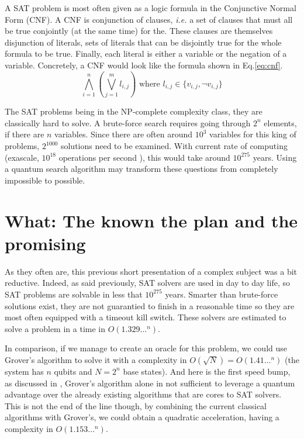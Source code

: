 \documentclass{article}
\begin{document}
A SAT problem is most often given as a logic formula in the Conjunctive Normal
Form (CNF). A CNF is conjunction of clauses, \emph{i.e.} a set of clauses that
must all be true conjointly (at the same time) for the. These clauses are
themselves disjunction of literals, sets of literals that can be disjointly true
for the whole formula to be true. Finally, each literal is either a variable or
the negation of a variable. Concretely, a CNF would look like the formula shown
in Eq.\ref{eq:cnf}.
\begin{equation}
\label{eq:cnf}
\bigwedge_{i=1}^n \left(\bigvee_{j=1}^m l_{i,j}\right) \text{ where } l_{i,j} \in
\{v_{i,j},\neg v_{i,j}\}
\end{equation}

The SAT problems being in the NP-complete complexity class, they are classically
hard to solve. A brute-force search requires going through $2^n$ elements, if
there are $n$ variables. Since there are often around $10^3$ variables for this
king of problems, $2^{1000}$ solutions need to be examined. With current rate of
computing (exascale, $10^{18}$ operations per second \cite{Hin18}), this would
take around $10^{275}$ years. Using a quantum search algorithm may transform
these questions from completely impossible to possible.

\section{What: The known the plan and the promising}
\label{sec:the_known_the_plan_and_the_promising}

As they often are, this previous short presentation of a complex subject was a
bit reductive. Indeed, as said previously, SAT solvers are used in day to day
life, so SAT problems are solvable in less that $10^{275}$ years. Smarter than
brute-force solutions exist, they are not guarantied to finish in a reasonable
time so they are most often equipped with a timeout kill switch. These solvers
are estimated to solve a problem in a time in $O(1.329\ldots^n)$. 

In comparison, if we manage to create an oracle for this problem, we could use
Grover's algorithm \cite{Gro96} to solve it with a complexity in $O(\sqrt{N})=O
(1.41\ldots^n)$ (the system has $n$ qubits and $N=2^n$ base states). And here is
the first speed bump, as discussed in \cite{Amb05}, Grover's algorithm alone in
not sufficient to leverage a quantum advantage over the already existing
algorithms that are cores to SAT solvers. This is not the end of the line
though, by combining the current classical algorithms with Grover's, we could
obtain a quadratic acceleration, having a complexity in $O(1.153\ldots^n)$.
\end{document}
